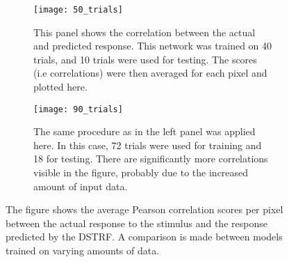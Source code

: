 \begin{figure}
	\begin{subfigure}{0.45\textwidth}
	\texttt{[image: 50\_trials]}
	\caption{This panel shows the correlation between the actual and predicted response. This network was trained on 40 trials, and 10 trials were used for testing. The scores (i.e correlations) were then averaged for each pixel and plotted here.}
	\end{subfigure}
	\hfill
	\begin{subfigure}{0.45\textwidth}
	\texttt{[image: 90\_trials]}
	\caption{The same procedure as in the left panel was applied here. In this case, 72 trials were used for training and 18 for testing. There are significantly more correlations visible in the figure, probably due to the increased amount of input data.}
\end{subfigure}
	\caption{The figure shows the average Pearson correlation scores per pixel between the actual response to the stimulus and the response predicted by the DSTRF. A comparison is made between models trained on varying amounts of data.}
	\label{fig:50trials}
\end{figure}

